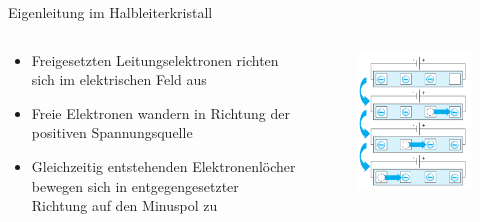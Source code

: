 \documentclass[12pt%
,aspectratio=169%
]{beamer}
\begin{document}
\begin{frame}{Eigenleitung im Halbleiterkristall}
\begin{columns}[T] %
\begin{column}{.48\textwidth}
\begin{itemize}
	\item Freigesetzten Leitungselektronen richten sich im elektrischen Feld aus
	\item Freie Elektronen wandern in Richtung der positiven Spannungsquelle
	\item Gleichzeitig entstehenden Elektronenlöcher bewegen sich in entgegengesetzter Richtung auf den Minuspol zu
\end{itemize}
\end{column}%
\hfill%
\begin{column}{.48\textwidth}
\vspace*{-0.3cm}
\begin{figure}
\center
\includegraphics[scale=.4]{pictures/eigenleitung}
\end{figure}
\end{column}%
\end{columns}
\end{frame}
\end{document}
